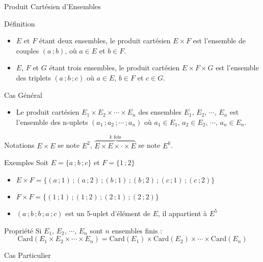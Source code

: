 \documentclass{cours}
\begin{document}
    \begin{Gpartie}{Produit Cartésien d'Ensembles}
        \begin{Spartie}{Définition}
            \begin{itemize}
                \item $E$ et $F$ étant deux ensembles, le produit cartésien $E\times F$ est l'ensemble de couples $(a\,;b)$, où $a\in E$ et $b\in F$.
                \item $E$, $F$ et $G$ étant trois ensembles, le produit cartésien $E\times F\times G$ est l'ensemble des triplets $(a\,;b\,;c)$ où $a\in E$, $b\in F$ et $c\in G$.
            \end{itemize}
            \begin{SSpartie}{Cas Général}
                \begin{itemize}
                    \item Le produit cartésien $E_1\times E_2\times\cdots\times E_n$ des ensembles $E_1,\,E_2,\,\cdots,\,E_n$ est l'ensemble des n-uplets $(a_1\,;a_2\,;\cdots\,;a_n)$ où $a_1\in E_1,\,a_2\in E_2,\,\cdots,\,a_n\in E_n$.
                \end{itemize}
            \end{SSpartie}
        \end{Spartie}
        \begin{Spartie}{Notations}
            $E\times E$ se note $E^2$, $\overbrace{E\times E\times\cdot\times E}^\text{$k$ fois}$ se note $E^k$.
        \end{Spartie}
        \begin{Spartie}{Exemples}
            Soit $E=\{a\,;b\,;c\}$ et $F=\{1\,;2\}$
            \begin{itemize}
                \item $E\times F=\{(a\,;1)\,;(a\,;2)\,;(b\,;1)\,;(b\,;2)\,;(c\,;1)\,;(c\,;2)\}$
                \item $F\times F=\{(1\,;1)\,;(1\,;2)\,;(2\,;1)\,;(2\,;2)\}$
                \item $(a\,;b\,;b\,;a\,;c)$ est un 5-uplet d'élément de $E$, il appartient à $E^5$
            \end{itemize}
        \end{Spartie}
        \begin{Spartie}{Propriété}
            Si $E_1,\,E_2,\,\cdots,\,E_n$ sont $n$ ensembles finis :
            \[\text{Card}(E_1\times E_2\times\cdots\times E_n)=\text{Card}(E_1)\times\text{Card}(E_2)\times\cdots\times\text{Card}(E_n)\]
            \begin{SSpartie}{Cas Particulier}

\end{SSpartie}
\end{Spartie}
\end{Gpartie}
\end{document}
